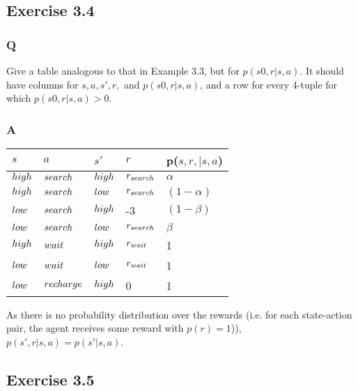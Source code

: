\subsection{Exercise 3.4}
\subsubsection*{Q}
Give a table analogous to that in Example 3.3, but for \(p(s0, r|s, a)\). It should have columns for \(s, a, s', r,\) and \(p(s0, r|s, a)\), and a row for every 4-tuple for which \(p(s0, r|s, a) > 0\).

\subsubsection*{A}
\begin{table}[]
	\begin{tabular}{llll|l}
\(s\) & \(a\) & \(s'\) & \(r\) & p(\(s, r, | s, a\)) \\ \hline 
$\mathnormal{high}$		& $ \mathnormal{search}$     & $\mathnormal{high} $       & \(r_{\mathnormal{search}}\)       &   \(\alpha\) \\
$\mathnormal{high}$		&  $\mathnormal{search}$     &  $\mathnormal{low}$      &   \(r_{\mathnormal{search}}\)     &  \((1-\alpha)\) \\                  
$\mathnormal{low}$		&  $\mathnormal{search}$     & $\mathnormal{high}$       & -3      & \((1-\beta)\)                    \\
$\mathnormal{low}$		&  $\mathnormal{search}$    & $\mathnormal{low} $       &  \(r_{\mathnormal{search}}\)      & \(\beta\) \\                     
$\mathnormal{high}$		&  $\mathnormal{wait}$     & $\mathnormal{high}$       & \(r_{\mathnormal{wait}}\)       &   1   \\
$\mathnormal{low}$		&  $\mathnormal{wait}$   & $\mathnormal{low}$       &  \(r_{\mathnormal{wait}}\)      &  1  \\
$\mathnormal{low}$		&  $\mathnormal{recharge}$   & $\mathnormal{high}$       &  0      &   1       \\
	\end{tabular}
\end{table}

As there is no probability distribution over the rewards (i.e. for each state-action pair, the agent receives some reward with \(p(r) = 1\))), \(p(s', r | s, a) = p(s' | s, a)\).

\subsection{Exercise 3.5}

